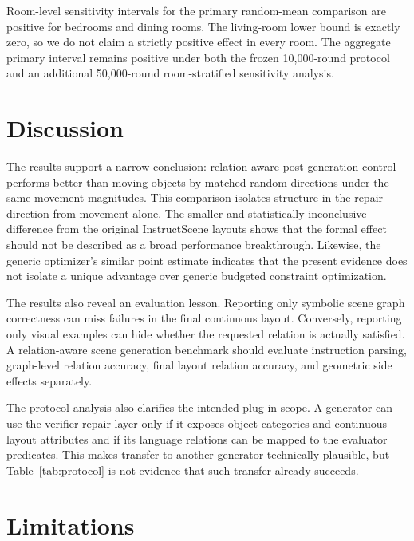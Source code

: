 \documentclass{egpubl}
\begin{document}
Room-level sensitivity intervals for the primary random-mean comparison are positive for bedrooms and dining rooms. The living-room lower bound is exactly zero, so we do not claim a strictly positive effect in every room. The aggregate primary interval remains positive under both the frozen 10,000-round protocol and an additional 50,000-round room-stratified sensitivity analysis.

\section{Discussion}

The results support a narrow conclusion: relation-aware post-generation control performs better than moving objects by matched random directions under the same movement magnitudes. This comparison isolates structure in the repair direction from movement alone. The smaller and statistically inconclusive difference from the original InstructScene layouts shows that the formal effect should not be described as a broad performance breakthrough. Likewise, the generic optimizer's similar point estimate indicates that the present evidence does not isolate a unique advantage over generic budgeted constraint optimization.

The results also reveal an evaluation lesson. Reporting only symbolic scene graph correctness can miss failures in the final continuous layout. Conversely, reporting only visual examples can hide whether the requested relation is actually satisfied. A relation-aware scene generation benchmark should evaluate instruction parsing, graph-level relation accuracy, final layout relation accuracy, and geometric side effects separately.

The protocol analysis also clarifies the intended plug-in scope. A generator can use the verifier-repair layer only if it exposes object categories and continuous layout attributes and if its language relations can be mapped to the evaluator predicates. This makes transfer to another generator technically plausible, but Table~\ref{tab:protocol} is not evidence that such transfer already succeeds.

\section{Limitations}
\end{document}
